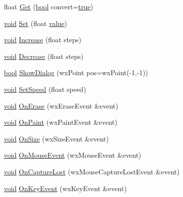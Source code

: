 \begin{DoxyCompactItemize}
float \hyperlink{class_a_slider_affaa4b1a2bf438eeeaab6bd6aa2e2b82}{Get} (\hyperlink{mac_2config_2i386_2lib-src_2libsoxr_2soxr-config_8h_abb452686968e48b67397da5f97445f5b}{bool} convert=\hyperlink{mac_2config_2i386_2lib-src_2libsoxr_2soxr-config_8h_a41f9c5fb8b08eb5dc3edce4dcb37fee7}{true})
\item 
\hyperlink{sound_8c_ae35f5844602719cf66324f4de2a658b3}{void} \hyperlink{class_a_slider_a2cd52681b27de76466727d8f3163215d}{Set} (float \hyperlink{lib_2expat_8h_a4a30a13b813682e68c5b689b45c65971}{value})
\item 
\hyperlink{sound_8c_ae35f5844602719cf66324f4de2a658b3}{void} \hyperlink{class_a_slider_aa30a03db66ef7cf0ed4870e3251586a6}{Increase} (float steps)
\item 
\hyperlink{sound_8c_ae35f5844602719cf66324f4de2a658b3}{void} \hyperlink{class_a_slider_aa74e54725a79f381647d85434840c81c}{Decrease} (float steps)
\item 
\hyperlink{mac_2config_2i386_2lib-src_2libsoxr_2soxr-config_8h_abb452686968e48b67397da5f97445f5b}{bool} \hyperlink{class_a_slider_a18409396b3b540484e5472c33e31f9ca}{Show\+Dialog} (wx\+Point pos=wx\+Point(-\/1,-\/1))
\item 
\hyperlink{sound_8c_ae35f5844602719cf66324f4de2a658b3}{void} \hyperlink{class_a_slider_a347d048a4135382c618f4f308bf7fca2}{Set\+Speed} (float speed)
\item 
\hyperlink{sound_8c_ae35f5844602719cf66324f4de2a658b3}{void} \hyperlink{class_a_slider_af81bf8e4846fda4286304816fa348b97}{On\+Erase} (wx\+Erase\+Event \&event)
\item 
\hyperlink{sound_8c_ae35f5844602719cf66324f4de2a658b3}{void} \hyperlink{class_a_slider_acecc5d52dc168694be614be386e17850}{On\+Paint} (wx\+Paint\+Event \&event)
\item 
\hyperlink{sound_8c_ae35f5844602719cf66324f4de2a658b3}{void} \hyperlink{class_a_slider_afde0c2be13e76f74179a87b6ebaece5a}{On\+Size} (wx\+Size\+Event \&event)
\item 
\hyperlink{sound_8c_ae35f5844602719cf66324f4de2a658b3}{void} \hyperlink{class_a_slider_ab405ec3d285db010b6083a25044260f4}{On\+Mouse\+Event} (wx\+Mouse\+Event \&event)
\item 
\hyperlink{sound_8c_ae35f5844602719cf66324f4de2a658b3}{void} \hyperlink{class_a_slider_aa62310a7354e8f993da9c3d9e1036988}{On\+Capture\+Lost} (wx\+Mouse\+Capture\+Lost\+Event \&event)
\item 
\hyperlink{sound_8c_ae35f5844602719cf66324f4de2a658b3}{void} \hyperlink{class_a_slider_aed83962fe737a606213665b11467c82c}{On\+Key\+Event} (wx\+Key\+Event \&event)

\end{DoxyCompactItemize}
